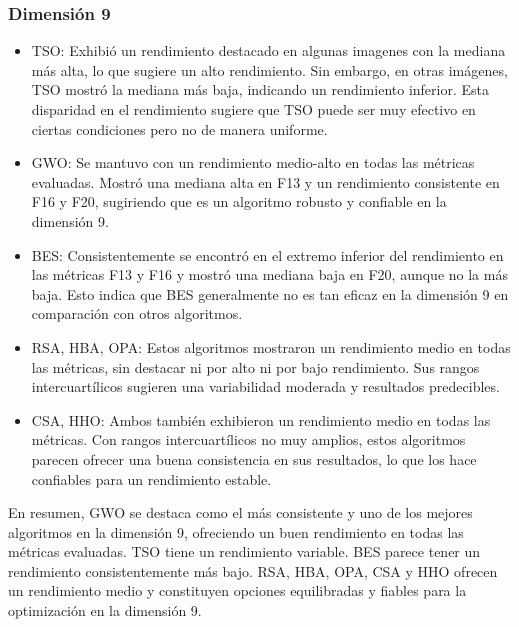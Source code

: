 \documentclass[conference]{IEEEtran}
\begin{document}
\subsubsection{Dimensión 9}
\begin{itemize}
\item TSO: Exhibió un rendimiento destacado en algunas imagenes con la mediana más alta, lo que sugiere un alto rendimiento. Sin embargo, en otras imágenes, TSO mostró la mediana más baja, indicando un rendimiento inferior. Esta disparidad en el rendimiento sugiere que TSO puede ser muy efectivo en ciertas condiciones pero no de manera uniforme.
	
\item GWO: Se mantuvo con un rendimiento medio-alto en todas las métricas evaluadas. Mostró una mediana alta en F13 y un rendimiento consistente en F16 y F20, sugiriendo que es un algoritmo robusto y confiable en la dimensión 9.
	
\item BES: Consistentemente se encontró en el extremo inferior del rendimiento en las métricas F13 y F16 y mostró una mediana baja en F20, aunque no la más baja. Esto indica que BES generalmente no es tan eficaz en la dimensión 9 en comparación con otros algoritmos.
	
\item RSA, HBA, OPA: Estos algoritmos mostraron un rendimiento medio en todas las métricas, sin destacar ni por alto ni por bajo rendimiento. Sus rangos intercuartílicos sugieren una variabilidad moderada y resultados predecibles.
	
\item CSA, HHO: Ambos también exhibieron un rendimiento medio en todas las métricas. Con rangos intercuartílicos no muy amplios, estos algoritmos parecen ofrecer una buena consistencia en sus resultados, lo que los hace confiables para un rendimiento estable.

\end{itemize}
\noindent En resumen, GWO se destaca como el más consistente y uno de los mejores algoritmos en la dimensión 9, ofreciendo un buen rendimiento en todas las métricas evaluadas. TSO tiene un rendimiento variable. BES parece tener un rendimiento consistentemente más bajo. RSA, HBA, OPA, CSA y HHO ofrecen un rendimiento medio y constituyen opciones equilibradas y fiables para la optimización en la dimensión 9.
\end{document}
